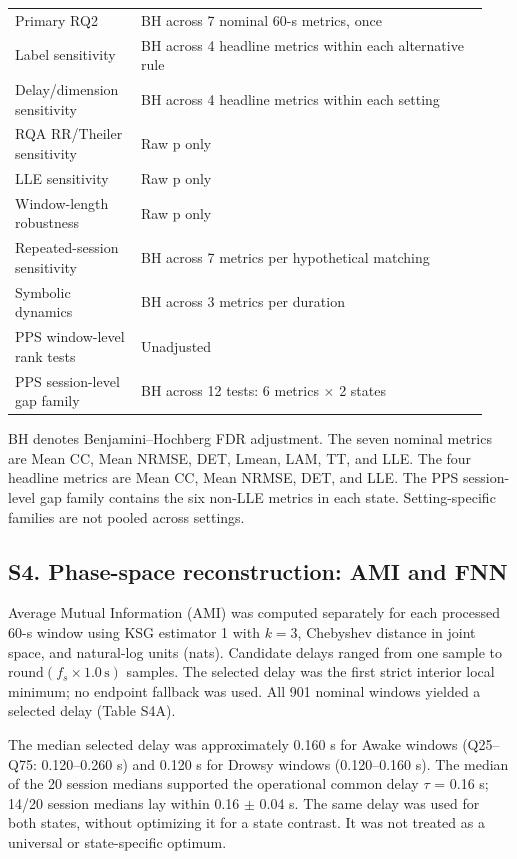 \begin{table}[p]
\begin{tabular}{>{\raggedright\arraybackslash}p{0.25\linewidth}>{\raggedright\arraybackslash}p{0.69\linewidth}}
\midrule
Primary RQ2 & BH across 7 nominal 60-s metrics, once \\
Label sensitivity & BH across 4 headline metrics within each alternative rule \\
Delay/dimension sensitivity & BH across 4 headline metrics within each setting \\
RQA RR/Theiler sensitivity & Raw p only \\
LLE sensitivity & Raw p only \\
Window-length robustness & Raw p only \\
Repeated-session sensitivity & BH across 7 metrics per hypothetical matching \\
Symbolic dynamics & BH across 3 metrics per duration \\
PPS window-level rank tests & Unadjusted \\
PPS session-level gap family & BH across 12 tests: 6 metrics $\times$ 2 states \\
\bottomrule
\end{tabular}
\par\smallskip
\begin{minipage}{0.98\linewidth}
\footnotesize BH denotes Benjamini--Hochberg FDR adjustment. The seven nominal metrics are Mean CC, Mean NRMSE, DET, Lmean, LAM, TT, and LLE. The four headline metrics are Mean CC, Mean NRMSE, DET, and LLE. The PPS session-level gap family contains the six non-LLE metrics in each state. Setting-specific families are not pooled across settings.
\end{minipage}
\end{table}

\subsection*{S4. Phase-space reconstruction: AMI and FNN}

Average Mutual Information (AMI) was computed separately for each processed 60-s window using KSG estimator 1 with $k=3$, Chebyshev distance in joint space, and natural-log units (nats). Candidate delays ranged from one sample to $\mathrm{round}(f_s\times1.0\,\mathrm{s})$ samples. The selected delay was the first strict interior local minimum; no endpoint fallback was used. All 901 nominal windows yielded a selected delay (Table S4A).

The median selected delay was approximately 0.160 s for Awake windows (Q25--Q75: 0.120--0.260 s) and 0.120 s for Drowsy windows (0.120--0.160 s). The median of the 20 session medians supported the operational common delay $\tau$ = 0.16 s; 14/20 session medians lay within 0.16 $\pm$ 0.04 s. The same delay was used for both states, without optimizing it for a state contrast. It was not treated as a universal or state-specific optimum.

